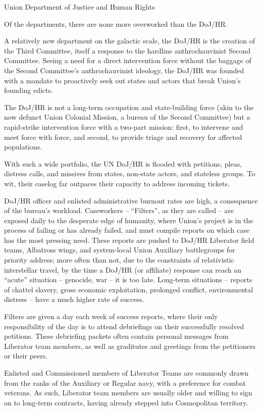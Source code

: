 Union Department of Justice and Human Rights

Of the departments, there are none more overworked than the DoJ/HR.

A relatively new department on the galactic scale, the DoJ/HR is the creation of the Third
Committee, itself a response to the hardline anthrochauvinist Second Committee. Seeing a need
for a direct intervention force without the baggage of the Second Committee’s anthrochauvinist
ideology, the DoJ/HR was founded with a mandate to proactively seek out states and actors that
break Union’s founding edicts.

The DoJ/HR is not a long-term occupation and state-building force (akin to the now defunct Union
Colonial Mission, a bureau of the Second Committee) but a rapid-strike intervention force with a
two-part mission: first, to intervene and meet force with force, and second, to provide triage and
recovery for affected populations.




With such a wide portfolio, the UN DoJ/HR is flooded with petitions, pleas, distress calls, and
missives from states, non-state actors, and stateless groups. To wit, their caselog far outpaces
their capacity to address incoming tickets.

DoJ/HR officer and enlisted administrative burnout rates are high, a consequence of the bureau’s
workload. Caseworkers -- “Filters”, as they are called -- are exposed daily to the desperate edge
of humanity, where Union’s project is in the process of failing or has already failed, and must
compile reports on which case has the most pressing need. These reports are pushed to DoJ/HR
Liberator field teams, Albatross wings, and system-local Union Auxiliary battlegroups for priority
address; more often than not, due to the constraints of relativistic interstellar travel, by the time a
DoJ/HR (or affiliate) response can reach an “acute” situation -- genocide, war -- it is too late.
Long-term situations -- reports of chattel slavery, gross economic exploitation, prolonged conflict,
environmental distress -- have a much higher rate of success.

Filters are given a day each week of success reports, where their only responsibility of the day is
to attend debriefings on their successfully resolved petitions. These debriefing packets often
contain personal messages from Liberator team members, as well as graditutes and greetings
from the petitioners or their peers.

Enlisted and Commissioned members of Liberator Teams are commonly drawn from the ranks of
the Auxiliary or Regular navy, with a preference for combat veterans. As such, Liberator team
members are usually older and willing to sign on to long-term contracts, having already stepped
into Cosmopolitan territory.

